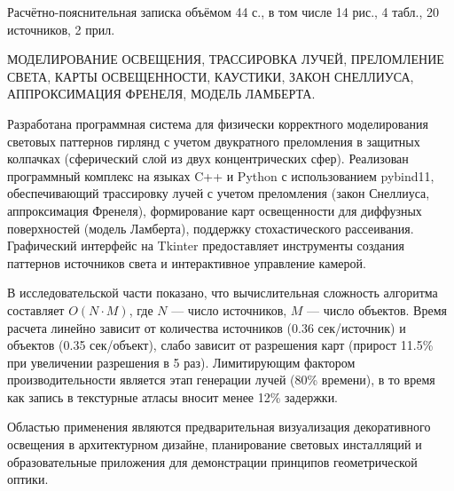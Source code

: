 
Расчётно-пояснительная записка объёмом 44 с., в том числе 14 рис., 4 табл., 20 источников, 2 прил.

МОДЕЛИРОВАНИЕ ОСВЕЩЕНИЯ, ТРАССИРОВКА ЛУЧЕЙ, ПРЕЛОМЛЕНИЕ СВЕТА, КАРТЫ ОСВЕЩЕННОСТИ, КАУСТИКИ, ЗАКОН СНЕЛЛИУСА, АППРОКСИМАЦИЯ ФРЕНЕЛЯ, МОДЕЛЬ ЛАМБЕРТА.

Разработана программная система для физически корректного моделирования световых паттернов гирлянд с учетом двукратного преломления в защитных колпачках (сферический слой из двух концентрических сфер). Реализован программный комплекс на языках C++ и Python с использованием pybind11, обеспечивающий трассировку лучей с учетом преломления (закон Снеллиуса, аппроксимация Френеля), формирование карт освещенности для диффузных поверхностей (модель Ламберта), поддержку стохастического рассеивания. Графический интерфейс на Tkinter предоставляет инструменты создания паттернов источников света и интерактивное управление камерой.

В исследовательской части показано, что вычислительная сложность алгоритма составляет $O(N \cdot M)$, где $N$ --- число источников, $M$ --- число объектов. Время расчета линейно зависит от количества источников (0.36 сек/источник) и объектов (0.35 сек/объект), слабо зависит от разрешения карт (прирост 11.5\% при увеличении разрешения в 5 раз). Лимитирующим фактором производительности является этап генерации лучей (80\% времени), в то время как запись в текстурные атласы вносит менее 12\% задержки.

Областью применения являются предварительная визуализация декоративного освещения в архитектурном дизайне, планирование световых инсталляций и образовательные приложения для демонстрации принципов геометрической оптики.